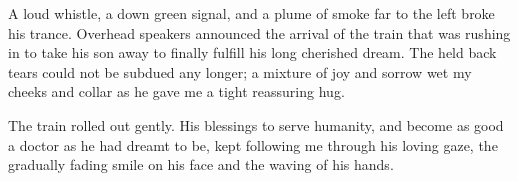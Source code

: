 A loud whistle, a down green signal, and a plume of smoke far to the left
broke his trance. Overhead speakers announced the arrival of the train
that was rushing in to take his son away to finally fulfill his long
cherished dream. The held back tears could not be subdued any longer;
a mixture of joy and sorrow wet my cheeks and collar as he gave me a tight
reassuring hug.

The train rolled out gently. His blessings to serve humanity, and become
as good a doctor as he had dreamt to be, kept following me through his
loving gaze, the gradually fading smile on his face and the waving of his
hands.
